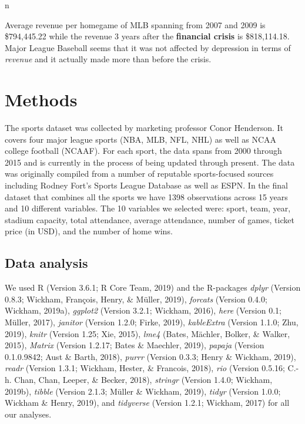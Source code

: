 \documentclass[man, fleqn, noextraspace,floatsintext]{apa6}
\begin{document}
{n}

Average revenue per homegame of MLB spanning from 2007 and 2009 is
\$794,445.22 while the revenue 3 years after the \textbf{financial
crisis} is \$818,114.18. Major League Baseball seems that it was not
affected by depression in terms of \emph{revenue} and it actually made
more than before the crisis.

\section{Methods}\label{methods}

The sports dataset was collected by marketing professor Conor Henderson.
It covers four major league sports (NBA, MLB, NFL, NHL) as well as NCAA
college football (NCAAF). For each sport, the data spans from 2000
through 2015 and is currently in the process of being updated through
present. The data was originally compiled from a number of reputable
sports-focused sources including Rodney Fort's Sports League Database as
well as ESPN. In the final dataset that combines all the sports we have
1398 observations across 15 years and 10 different variables. The 10
variables we selected were: sport, team, year, stadium capacity, total
attendance, average attendance, number of games, ticket price (in USD),
and the number of home wins.

\subsection{Data analysis}\label{data-analysis}

We used R (Version 3.6.1; R Core Team, 2019) and the R-packages
\emph{dplyr} (Version 0.8.3; Wickham, François, Henry, \& Müller, 2019),
\emph{forcats} (Version 0.4.0; Wickham, 2019a), \emph{ggplot2} (Version
3.2.1; Wickham, 2016), \emph{here} (Version 0.1; Müller, 2017),
\emph{janitor} (Version 1.2.0; Firke, 2019), \emph{kableExtra} (Version
1.1.0; Zhu, 2019), \emph{knitr} (Version 1.25; Xie, 2015), \emph{lme4}
(Bates, Mächler, Bolker, \& Walker, 2015), \emph{Matrix} (Version
1.2.17; Bates \& Maechler, 2019), \emph{papaja} (Version 0.1.0.9842;
Aust \& Barth, 2018), \emph{purrr} (Version 0.3.3; Henry \& Wickham,
2019), \emph{readr} (Version 1.3.1; Wickham, Hester, \& Francois, 2018),
\emph{rio} (Version 0.5.16; C.-h. Chan, Chan, Leeper, \& Becker, 2018),
\emph{stringr} (Version 1.4.0; Wickham, 2019b), \emph{tibble} (Version
2.1.3; Müller \& Wickham, 2019), \emph{tidyr} (Version 1.0.0; Wickham \&
Henry, 2019), and \emph{tidyverse} (Version 1.2.1; Wickham, 2017) for
all our analyses.
\end{document}
